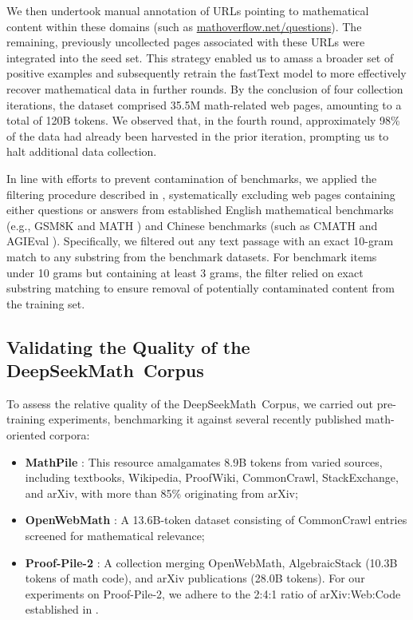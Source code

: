 We then undertook manual annotation of URLs pointing to mathematical content within these domains (such as \url{mathoverflow.net/questions}). The remaining, previously uncollected pages associated with these URLs were integrated into the seed set. This strategy enabled us to amass a broader set of positive examples and subsequently retrain the fastText model to more effectively recover mathematical data in further rounds. By the conclusion of four collection iterations, the dataset comprised 35.5M math-related web pages, amounting to a total of 120B tokens. We observed that, in the fourth round, approximately 98\% of the data had already been harvested in the prior iteration, prompting us to halt additional data collection.

In line with efforts to prevent contamination of benchmarks, we applied the filtering procedure described in \cite{deepseek-coder}, systematically excluding web pages containing either questions or answers from established English mathematical benchmarks (e.g., GSM8K \citep{gsm8k} and MATH \citep{MATH}) and Chinese benchmarks (such as CMATH \citep{wei2023cmath} and AGIEval \citep{agieval}). Specifically, we filtered out any text passage with an exact 10-gram match to any substring from the benchmark datasets. For benchmark items under 10 grams but containing at least 3 grams, the filter relied on exact substring matching to ensure removal of potentially contaminated content from the training set.

\subsection{Validating the Quality of the DeepSeekMath~Corpus}

To assess the relative quality of the DeepSeekMath~Corpus, we carried out pre-training experiments, benchmarking it against several recently published math-oriented corpora:

\begin{itemize}[topsep=0pt]
    \item \textbf{MathPile} \citep{mathpile}: This resource amalgamates 8.9B tokens from varied sources, including textbooks, Wikipedia, ProofWiki, CommonCrawl, StackExchange, and arXiv, with more than 85\% originating from arXiv;
    \item \textbf{OpenWebMath} \citep{openwebmath}: A 13.6B-token dataset consisting of CommonCrawl entries screened for mathematical relevance;
    \item \textbf{Proof-Pile-2} \citep{llemma}: A collection merging OpenWebMath, AlgebraicStack (10.3B tokens of math code), and arXiv publications (28.0B tokens). For our experiments on Proof-Pile-2, we adhere to the 2:4:1 ratio of arXiv:Web:Code established in \cite{llemma}.
\end{itemize}

